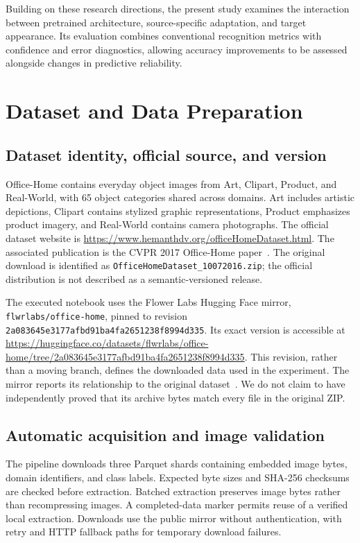 \documentclass[10pt,a4paper]{article}
\begin{document}
Building on these research directions, the present study examines the interaction between pretrained architecture, source-specific adaptation, and target appearance. Its evaluation combines conventional recognition metrics with confidence and error diagnostics, allowing accuracy improvements to be assessed alongside changes in predictive reliability.


\section{Dataset and Data Preparation}
\subsection{Dataset identity, official source, and version}
Office-Home contains everyday object images from Art, Clipart, Product, and Real-World, with 65 object categories shared across domains. Art includes artistic depictions, Clipart contains stylized graphic representations, Product emphasizes product imagery, and Real-World contains camera photographs. The official dataset website is \url{https://www.hemanthdv.org/officeHomeDataset.html}. The associated publication is the CVPR 2017 Office-Home paper~\cite{officehome}. The original download is identified as \texttt{OfficeHomeDataset\_10072016.zip}; the official distribution is not described as a semantic-versioned release.

The executed notebook uses the Flower Labs Hugging Face mirror, \texttt{flwrlabs/office-home}, pinned to revision \texttt{2a083645e3177afbd91ba4fa2651238f8994d335}. Its exact version is accessible at \url{https://huggingface.co/datasets/flwrlabs/office-home/tree/2a083645e3177afbd91ba4fa2651238f8994d335}. This revision, rather than a moving branch, defines the downloaded data used in the experiment. The mirror reports its relationship to the original dataset~\cite{mirror}. We do not claim to have independently proved that its archive bytes match every file in the original ZIP.

\subsection{Automatic acquisition and image validation}
The pipeline downloads three Parquet shards containing embedded image bytes, domain identifiers, and class labels. Expected byte sizes and SHA-256 checksums are checked before extraction. Batched extraction preserves image bytes rather than recompressing images. A completed-data marker permits reuse of a verified local extraction. Downloads use the public mirror without authentication, with retry and HTTP fallback paths for temporary download failures.
\end{document}
